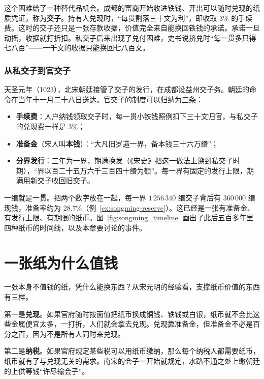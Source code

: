 这个困难给了一种替代品机会。成都的富商开始收进铁钱、开出可以随时兑现的纸质凭证，称为\textbf{交子}。持有人兑现时，“每贯割落三十文为利”，即收取 3\% 的手续费。这时的交子还只是一张存款收据，价值完全来自能换回铁钱的承诺。承诺一旦动摇，收据就打折扣。私交子后来出现了兑付困难，史书说挤兑时“每一贯多只得七八百”\cite{songchaoshishi}——一千文的收据只能换回七八百文。

\subsubsection{从私交子到官交子}
天圣元年（1023），北宋朝廷接管了交子的发行，在成都设益州交子务。朝廷的命令在当年十一月二十八日送达\cite{songchaoshishi}。官交子的制度可以归纳为三条：
\begin{itemize}
\item \textbf{手续费}：人户纳钱领取交子时，每一贯小铁钱照例扣下三十文归官，与私交子的兑现费一样是 3\%；
\item \textbf{准备金}（宋人叫\textbf{本钱}）：“大凡旧岁造一界，备本钱三十六万缗”\cite{songshi}；
\item \textbf{分界发行}：三年为一界，期满换发（《宋史》把这一做法上溯到私交子时期），“界以百二十五万六千三百四十缗为额”\cite{songshi}。每一界有固定的发行上限，期满用新交子收回旧交子。
\end{itemize}
一缗就是一贯。把两个数字放在一起，每一界 $1\,256\,340$ 缗交子背后有 $360\,000$ 缗现钱，准备率约为 28.7\%（例~\ref{ex:songming-reserve}）。这已经是一张有准备金、有发行上限、有期限的纸币。图~\ref{fig:songming_timeline} 画出了此后五百多年里四种纸币的时间线，以及本章要讨论的事件。


\section{一张纸为什么值钱}\label{sec:songming-value}

一张本身不值钱的纸，凭什么能换东西？从宋元明的经验看，支撑纸币价值的东西有三样。

第一是\textbf{兑现}。如果官府随时按面值把纸币换成铜钱、铁钱或白银，纸币就不会比这些金属便宜太多，一打折，人们就会拿去兑现。兑现靠准备金，但准备金不必是百分之百，因为不是所有人同时来兑现。

第二是\textbf{纳税}。如果官府规定某些税可以用纸币缴纳，那么每个纳税人都需要纸币，纸币就有了与兑现无关的需求。南宋的会子一开始就规定，水路不通之处上缴朝廷的上供等钱“许尽输会子”\cite{songshi}。

